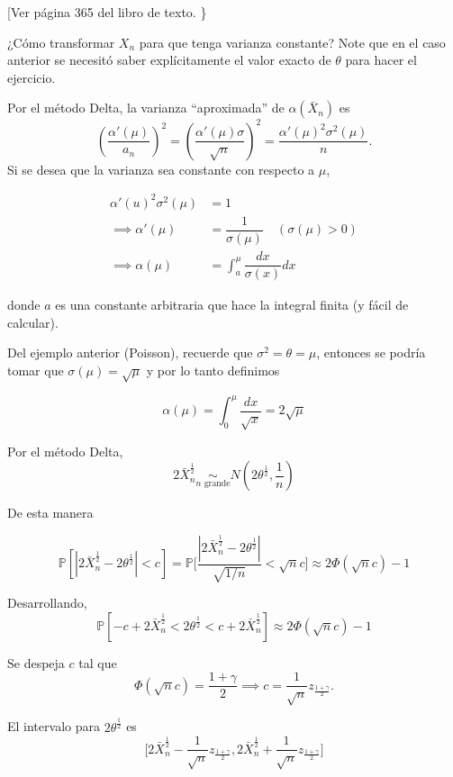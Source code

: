 \documentclass[
  12pt,
]{book}
\begin{document}
{[}Ver página 365 del libro de texto. \}

¿Cómo transformar \(X_n\) para que tenga varianza constante? Note que en el caso
anterior se necesitó saber explícitamente el valor exacto de \(\theta\) para
hacer el ejercicio.

Por el método Delta, la varianza ``aproximada'' de \(\alpha(\bar X_n)\) es \[\left(
\dfrac{\alpha'(\mu)}{a_n}\right)^2 =\left( \dfrac{\alpha'(\mu)\sigma}{\sqrt n}\right)^2 =
\dfrac{\alpha'(\mu)^2\sigma^2(\mu)}{n}.\] Si se desea que la varianza sea constante con
respecto a \(\mu\),

\begin{align*}
\alpha'(u)^2\sigma^2(\mu) &= 1 \\
\implies \alpha'(\mu) & = \dfrac{1}{\sigma(\mu)} \quad (\sigma(\mu)>0)\\
\implies \alpha(\mu) &=
\int_{a}^{\mu} \dfrac{dx}{\sigma(x)}dx
\end{align*}

donde \(a\) es una constante arbitraria que hace la integral finita (y fácil de
calcular).

Del ejemplo anterior (Poisson), recuerde que \(\sigma ^{2} = \theta = \mu\), entonces se
podría tomar que \(\sigma(\mu) = \sqrt{\mu}\) y por lo tanto definimos

\[
\alpha(\mu) = \int_{0}^\mu\dfrac{dx}{\sqrt x} = 2\sqrt \mu
\]

Por el método Delta,\\
\[
2\bar X_n^{\frac12} \underset{n \text{ grande}}{\sim}
N\left(2\theta^{\frac 12},\dfrac1n\right)
\]

De esta manera

\[\mathbb P[|2\bar X_n^{\frac12}-2\theta^{\frac12}|<c] =\mathbb P\Bigg[\dfrac{|2\bar
X_n^{\frac12}-2\theta^{\frac12}|}{\sqrt{1/n}}<\sqrt nc\Bigg] \approx 2\Phi(\sqrt nc)-1 \]

Desarrollando, \[\mathbb P[-c+2\bar X_n^{\frac12}<2\theta^{\frac 12}<c+2\bar
X_n^{\frac12}]\approx 2\Phi(\sqrt nc)-1 \]

Se despeja \(c\) tal que \[\Phi(\sqrt n c) = \dfrac{1+\gamma}2\implies c = \dfrac 1{\sqrt
n} z_{\frac{1+\gamma}2}.\]

El intervalo para \(2\theta^{\frac 12}\) es \[\bigg[2\bar X_n^{\frac 12} -\dfrac
1{\sqrt n} z_{\frac{1+\gamma}2},2\bar X_n^{\frac 12} +\dfrac 1{\sqrt n}
z_{\frac{1+\gamma}2}\bigg]\]
\end{document}
